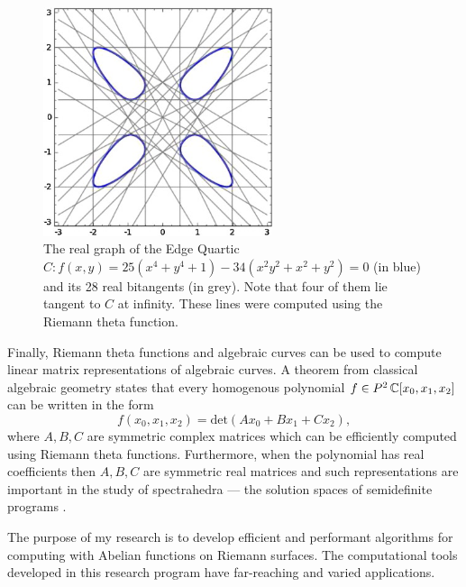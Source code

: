 \begin{figure}[t]
  \centering
  \includegraphics[width=0.6\textwidth]{images/bitangents.jpg}
  \caption{The real graph of the Edge Quartic $C: f(x,y) = 25(x^4+y^4+1)
    - 34(x^2y^2+x^2+y^2) = 0$ (in blue) and its 28 real bitangents (in
    grey). Note that four of them lie tangent to $C$ at infinity. These
    lines were computed using the Riemann theta function.}
  \label{fig: edge}
\end{figure}

Finally, Riemann theta functions and algebraic curves can be used to
compute linear matrix representations of algebraic curves. A theorem
from classical algebraic geometry states that every homogenous
polynomial $f \in P^2\operatorname{\mathbb{C}}[x_0,x_1,x_2]$ can be written in the form
\[
   f(x_0,x_1,x_2) = \text{det}
   \left( A x_0 + B x_1 + C x_2 \right),
\]
where $A,B,C$ are symmetric complex matrices which can be efficiently
computed using Riemann theta functions. Furthermore, when the polynomial
has real coefficients then $A,B,C$ are symmetric real matrices and such
representations are important in the study of spectrahedra --- the
solution spaces of semidefinite programs \cite{PSV10}.

The purpose of my research is to develop efficient and performant
algorithms for computing with Abelian functions on Riemann surfaces. The
computational tools developed in this research program have far-reaching
and varied applications.

